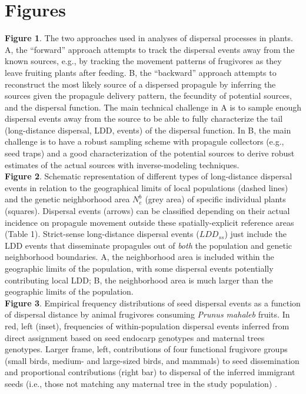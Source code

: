 \documentclass[a4paper, 12pt]{article}
\begin{document}
\section*{Figures}
\begin{linenumbers}

\textbf{Figure 1}. The two approaches used in analyses of dispersal processes in plants. A, the “forward” approach attempts to track the dispersal events away from the known sources, e.g., by tracking the movement patterns of frugivores as they leave fruiting plants after feeding. B, the “backward” approach  attempts to reconstruct the most likely source of a dispersed propagule by inferring the sources given the propagule delivery pattern, the fecundity of potential sources, and the dispersal function. The main technical challenge in A is to sample enough dispersal events away from the source to be able to fully characterize the tail (long-distance dispersal, LDD, events) of the dispersal function. In B, the main challenge is to have a robust sampling scheme with propagule collectors (e.g., seed traps) and a good characterization of the potential sources to derive robust estimates of the actual sources with inverse-modeling techniques.\\
 
\textbf{Figure 2}. Schematic representation of different types of long-distance dispersal events in relation to the geographical limits of local populations (dashed lines) and the genetic neighborhood area $N^b_e$ (grey area) of specific individual plants (squares). Dispersal events (arrows) can be classified depending on their actual incidence on propagule movement outside these spatially-explicit reference areas (Table 1). Strict-sense long-distance dispersal events ($LDD_{ss}$) just include the LDD events that disseminate propagules out of \textit{both} the population and genetic neighborhood boundaries. A, the neighborhood area is included within the geographic limits of the population, with some dispersal events potentially contributing local LDD; B, the neighborhood area is much larger than the geographic limits of the population.\\
 
\textbf{Figure 3}. Empirical frequency distributions of seed dispersal events as a function of dispersal distance by animal frugivores consuming \textit{Prunus mahaleb} fruits. In red, left (inset), frequencies of within-population dispersal events inferred from direct assignment based on seed endocarp genotypes and maternal trees genotypes. Larger frame, left, contributions of four functional frugivore groups (small birds, medium- and large-sized birds, and mammals) to seed dissemination and proportional contributions (right bar) to dispersal of the inferred immigrant seeds (i.e., those not matching any maternal tree in the study population) \citep{Jordano:2007}.\\
 

\end{linenumbers}
\end{document}
